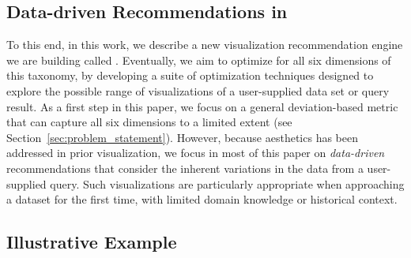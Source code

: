 \subsection*{Data-driven Recommendations in \SeeDB}

To this end, in this work, we describe a new visualization recommendation engine we are building called {\it \SeeDB}.
Eventually, we aim to optimize for all six dimensions of this taxonomy, by developing a suite of optimization techniques designed to explore
the possible range of visualizations of a user-supplied data set or query result.  
As a first step in this paper, we focus on  a general deviation-based metric that can capture all six dimensions to a limited extent (see Section~\ref{sec:problem_statement}).  However, because aesthetics has been addressed in prior visualization, we focus in most of this paper on 
{\it data-driven} recommendations that consider the inherent variations in the data from a user-supplied query.  Such visualizations are particularly appropriate when
approaching a dataset for the first time, with limited domain knowledge or historical context.



\subsection*{Illustrative Example}

